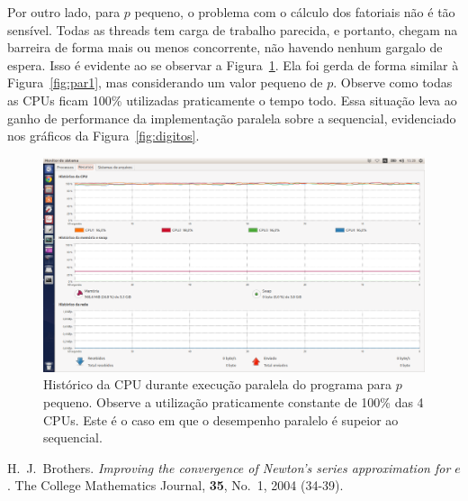 \documentclass[12pt]{article}
\begin{document}
Por outro lado, para $p$ pequeno, o problema com o cálculo dos fatoriais não é tão sensível. Todas
as threads tem carga de trabalho parecida, e portanto, chegam na barreira de forma mais ou menos 
concorrente, não havendo nenhum gargalo de espera. Isso é evidente ao se observar a 
Figura~\ref{fig:par2}. Ela foi gerda de forma similar à Figura~\ref{fig:par1}, mas considerando um
valor pequeno de $p$. Observe como todas as CPUs ficam 100\% utilizadas praticamente o tempo todo.
Essa situação leva ao ganho de performance da implementação paralela sobre a sequencial, evidenciado
nos gráficos da Figura~\ref{fig:digitos}.

\begin{figure}[ht]
	\begin{center}
		\includegraphics[scale=0.275]{paralela2.png}
		\caption{Histórico da CPU durante execução paralela do programa para $p$ pequeno. Observe a 
		utilização praticamente constante de 100\% das 4 CPUs. Este é o caso em que o desempenho 
		paralelo é supeior ao sequencial.}
		\label{fig:par2} 
	\end{center}
\end{figure}


\begin{thebibliography}{9}

 H.~J.~Brothers. {\it Improving the convergence of Newton's series approximation 
for $e$}. The College Mathematics Journal, {\bf 35}, No.~1, 2004 (34-39).

\end{thebibliography}

\end{document}
